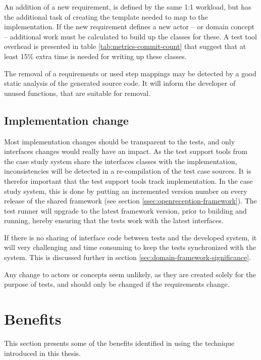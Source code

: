 \noindent An addition of a new requirement, is defined by the same 1:1 workload, but has the additional task of creating the template needed to map to the implementation. If the new requirement defines a new actor -- or domain concept -- additional work must be calculated to build up the classes for these. A test tool overhead is presented in table \ref{tab:metrics-commit-count} that suggest that at least 15\% extra time is needed for writing up these classes.\medskip

\noindent The removal of a requirements or used step mappings may be detected by a good static analysis of the generated source code. It will inform the developer of unused functions, that are suitable for removal.

\subsection{Implementation change}
Most implementation changes should be transparent to the tests, and only interfaces changes would really have an impact. As the test support tools from the case study system share the interfaces classes with the implementation, inconsistencies will be detected in a re-compilation of the test case sources. It is therefor important that the test support tools track implementation. In the case study system, this is done by putting an incremented version number on every release of the shared framework (see section \ref{ssec:openreception-framework}). The test runner will upgrade to the latest framework version, prior to building and running, hereby ensuring that the tests work with the latest interfaces.\medskip

\noindent If there is no sharing of interface code between tests and the developed system, it will very challenging and time consuming to keep the tests synchronized with the system. This is discussed further in section \ref{sec:domain-framework-significance}.\medskip

\noindent Any change to actors or concepts seem unlikely, as they are created solely for the purpose of tests, and should only be changed if the requirements change.

\section{Benefits}
This section presents some of the benefits identified in using the technique introduced in this thesis.



